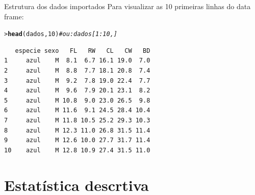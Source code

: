 \documentclass[10pt]{beamer}\usepackage[]{graphicx}\usepackage[]{color}
\makeatletter
\newcommand{\hlnum}[1]{\textcolor[rgb]{0.686,0.059,0.569}{#1}}%
\newcommand{\hlcom}[1]{\textcolor[rgb]{0.498,0.498,0.498}{\textit{#1}}}%
\newcommand{\hlstd}[1]{\textcolor[rgb]{0.345,0.345,0.345}{#1}}%
\newcommand{\hlkwd}[1]{\textcolor[rgb]{0.282,0.239,0.545}{\textbf{#1}}}%
\newenvironment{kframe}{%
 \def\at@end@of@kframe{}%
 \ifinner\ifhmode%
  \def\at@end@of@kframe{\end{minipage}}%
  \begin{minipage}{\columnwidth}%
 \fi\fi%
 \def\FrameCommand##1{\hskip\@totalleftmargin \hskip-\fboxsep
 \colorbox{shadecolor}{##1}\hskip-\fboxsep
     \hskip-\linewidth \hskip-\@totalleftmargin \hskip\columnwidth}%
 \MakeFramed {\advance\hsize-\width
   \@totalleftmargin\z@ \linewidth\hsize
   \@setminipage}}%
 {\par\unskip\endMakeFramed%
 \at@end@of@kframe}
\newenvironment{knitrout}{}{} %
\makeatother
\begin{document}
\begin{frame}[fragile=singleslide]{Estrutura dos dados importados}
Para visualizar as 10 primeiras linhas do data frame:
\begin{knitrout}\small
{}\color{fgcolor}\begin{kframe}
\begin{alltt}
\hlstd{> }\hlkwd{head}\hlstd{(dados,} \hlnum{10}\hlstd{)} \hlcom{# ou: dados[1:10,]}
\end{alltt}
\begin{verbatim}
   especie sexo   FL   RW   CL   CW   BD
1     azul    M  8.1  6.7 16.1 19.0  7.0
2     azul    M  8.8  7.7 18.1 20.8  7.4
3     azul    M  9.2  7.8 19.0 22.4  7.7
4     azul    M  9.6  7.9 20.1 23.1  8.2
5     azul    M 10.8  9.0 23.0 26.5  9.8
6     azul    M 11.6  9.1 24.5 28.4 10.4
7     azul    M 11.8 10.5 25.2 29.3 10.3
8     azul    M 12.3 11.0 26.8 31.5 11.4
9     azul    M 12.6 10.0 27.7 31.7 11.4
10    azul    M 12.8 10.9 27.4 31.5 11.0
\end{verbatim}
\end{kframe}
\end{knitrout}

\end{frame}


\section{Estatística descrtiva}
\end{document}
